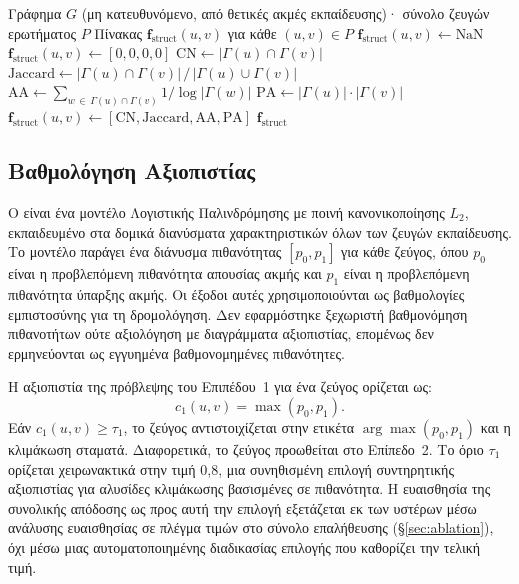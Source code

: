 \begin{algorithm}[htbp]
\caption{Υπολογισμός Δομικών Ευρετικών Δεικτών}
\label{alg:heuristics}
\begin{algorithmic}[1]
\Require Γράφημα $G$ (μη κατευθυνόμενο, από θετικές ακμές εκπαίδευσης)· σύνολο
    ζευγών ερωτήματος $P$
\Ensure Πίνακας $\mathbf{f}_{\text{struct}}(u,v)$ για κάθε $(u,v) \in P$
        \State $\mathbf{f}_{\text{struct}}(u,v) \gets \text{NaN}$
        \State $\mathbf{f}_{\text{struct}}(u,v) \gets [0, 0, 0, 0]$
    \Else
        \State $\mathrm{CN} \gets |\Gamma(u) \cap \Gamma(v)|$
        \State $\mathrm{Jaccard} \gets |\Gamma(u) \cap \Gamma(v)| \,/\, |\Gamma(u) \cup \Gamma(v)|$
        \State $\mathrm{AA} \gets \sum_{w \,\in\, \Gamma(u) \cap \Gamma(v)} 1 / \log|\Gamma(w)|$
        \State $\mathrm{PA} \gets |\Gamma(u)| \cdot |\Gamma(v)|$
        \State $\mathbf{f}_{\text{struct}}(u,v) \gets [\mathrm{CN}, \mathrm{Jaccard}, \mathrm{AA}, \mathrm{PA}]$
    \EndIf
\EndFor
\State \Return $\mathbf{f}_{\text{struct}}$
\end{algorithmic}
\end{algorithm}

\subsection{Βαθμολόγηση Αξιοπιστίας}
\label{subsec:confidence-scoring}

Ο  είναι ένα μοντέλο Λογιστικής Παλινδρόμησης με ποινή
κανονικοποίησης $L_2$, εκπαιδευμένο στα δομικά διανύσματα χαρακτηριστικών όλων των
ζευγών εκπαίδευσης.
Το μοντέλο παράγει ένα διάνυσμα πιθανότητας $[p_0, p_1]$ για
κάθε ζεύγος, όπου $p_0$ είναι η προβλεπόμενη πιθανότητα απουσίας ακμής και $p_1$
είναι η προβλεπόμενη πιθανότητα ύπαρξης ακμής.
Οι έξοδοι αυτές χρησιμοποιούνται ως βαθμολογίες εμπιστοσύνης για τη
δρομολόγηση.
Δεν εφαρμόστηκε ξεχωριστή βαθμονόμηση πιθανοτήτων ούτε αξιολόγηση με
διαγράμματα αξιοπιστίας, επομένως δεν ερμηνεύονται ως εγγυημένα βαθμονομημένες
πιθανότητες.

Η αξιοπιστία της πρόβλεψης του Επιπέδου~1 για ένα ζεύγος ορίζεται ως:
\begin{equation}
    c_1(u, v) = \max(p_0, p_1).
    \label{eq:confidence-tier1}
\end{equation}
Εάν $c_1(u, v) \geq \tau_1$, το ζεύγος αντιστοιχίζεται στην ετικέτα $\arg\max(p_0,
p_1)$ και η κλιμάκωση σταματά.
Διαφορετικά, το ζεύγος προωθείται στο Επίπεδο~2.
Το όριο $\tau_1$ ορίζεται χειρωνακτικά στην τιμή 0{,}8, μια συνηθισμένη επιλογή
συντηρητικής αξιοπιστίας για αλυσίδες κλιμάκωσης βασισμένες σε πιθανότητα.
Η
ευαισθησία της συνολικής απόδοσης ως προς αυτή την επιλογή εξετάζεται εκ των
υστέρων μέσω ανάλυσης ευαισθησίας σε πλέγμα τιμών στο σύνολο επαλήθευσης
(\S\ref{sec:ablation}), όχι μέσω μιας αυτοματοποιημένης διαδικασίας επιλογής που
καθορίζει την τελική τιμή.


